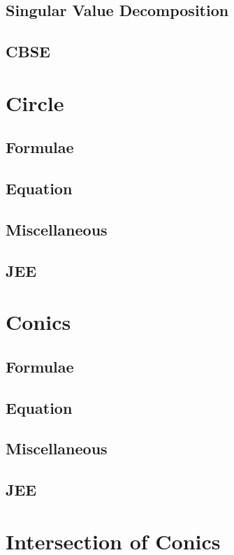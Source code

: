 \documentclass[journal]{IEEEtran}
\begin{document}
\subsection{Singular Value Decomposition}

\subsection{CBSE}

\newpage
\section{Circle}
\subsection{Formulae}

\subsection{Equation}

\subsection{Miscellaneous}

\subsection{JEE}

\newpage
\section{Conics}
\subsection{Formulae}

\subsection{Equation}

\subsection{Miscellaneous}

\subsection{JEE}
 
\newpage
\section{Intersection of Conics}
\end{document}
